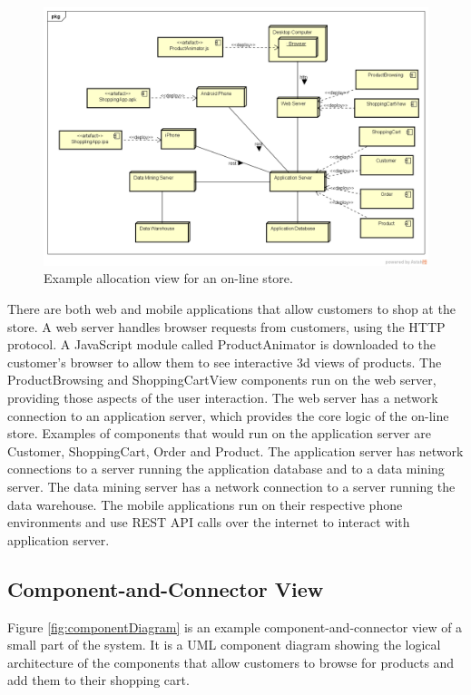 \begin{figure}[h]
    \includegraphics[trim=37 57 20 40,clip,width=\textwidth]{images/deployment_diagram.png}
    \caption{Example allocation view for an on-line store.}
    \label{fig:deploymentDiagram}
\end{figure}

There are both web and mobile applications that allow customers to shop at the store.
A web server handles browser requests from customers, using the HTTP protocol.
A JavaScript module called ProductAnimator is downloaded to the customer's browser to allow them to see interactive 3d views of products.
The ProductBrowsing and ShoppingCartView components run on the web server, providing those aspects of the user interaction.
The web server has a network connection to an application server, which provides the core logic of the on-line store.
Examples of components that would run on the application server are Customer, ShoppingCart, Order and Product.
The application server has network connections to a server running the application database and to a data mining server.
The data mining server has a network connection to a server running the data warehouse.
The mobile applications run on their respective phone environments and use REST API calls over the internet to interact with application server.

\subsection{Component-and-Connector View}
Figure \ref{fig:componentDiagram} is an example component-and-connector view of a small part of the system.
It is a UML component diagram showing the logical architecture of the components that allow customers to browse for products and add them to their shopping cart.

